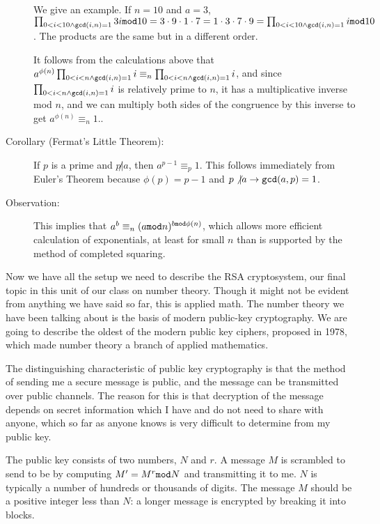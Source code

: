\documentclass[12pt]{article}
\begin{document}
\begin{description}
We give an example.  If $n=10$ and $a=3$, $\prod_{0<i<10 \wedge {\tt gcd}(i,n)=1} 3i{\tt mod}10 = 3\cdot9\cdot1\cdot 7 = 1\cdot3\cdot7\cdot 9 =\prod_{0<i<10 \wedge {\tt gcd}(i,n)=1} i{\tt mod}10$.  The products are the same but in a different order.

It follows from the calculations above that $a^{\phi(n)}\prod_{0<i<n \wedge {\tt gcd}(i,n)=1} i \equiv_n \prod_{0<i<n \wedge {\tt gcd}(i,n)=1} i$, and since $\prod_{0<i<n \wedge {\tt gcd}(i,n)=1} i$ is relatively prime to $n$, it has a multiplicative inverse mod $n$, and we can multiply both sides of the congruence by this inverse to get $a^{\phi(n)} \equiv_n 1$..

\item[Corollary (Fermat's Little Theorem):]  If $p$ is a prime and $p \not| a$, then $a^{p-1} \equiv_p 1$.  This follows immediately from Euler's Theorem because $\phi(p) = p-1$ and $p \not| a \rightarrow {\tt gcd}(a,p)=1$.

\item[Observation:]  This implies that $a^b \equiv_n (a {\tt mod} n)^{b {\tt mod} \phi(n)}$, which allows more efficient calculation of exponentials, at least for small $n$ than is supported by the method of completed squaring.


\end{description}

Now we have all the setup we need to describe the RSA cryptosystem, our final topic in this unit of our class on number theory.  Though it might not be evident from anything we have said so far, this is applied math.  The number theory we have been talking about is the basis of modern public-key cryptography.  We are going to describe the oldest of the modern public key ciphers, proposed in 1978, which made number theory a branch of applied mathematics.

The distinguishing characteristic of public key cryptography is that the method of sending me a secure message is public, and the message can be transmitted over public channels.  The reason for this is that decryption of the message depends on secret information which I have and do not need to share with anyone, which so far as anyone knows is very difficult to determine from my public key.

The public key consists of two numbers, $N$ and $r$.  A message $M$ is scrambled to send to be by computing
$M' = M^r {\tt mod}N$ and transmitting it to me.  $N$ is typically a number of hundreds or thousands of digits.  The message $M$ should be a positive integer less than $N$:  a longer message is encrypted by breaking it into blocks.
\end{document}
